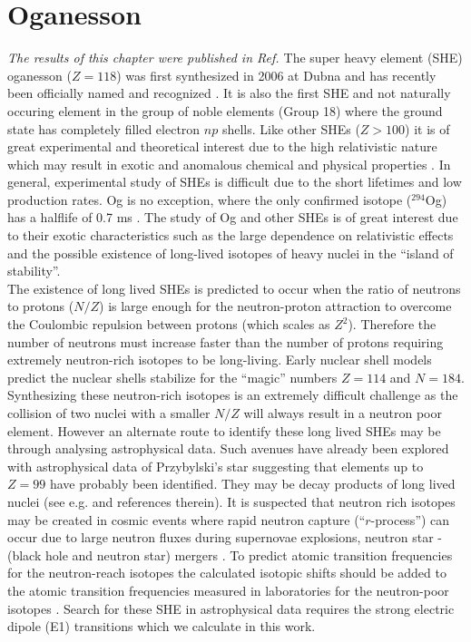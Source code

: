 \documentclass[10pt,a4paper, twoside]{report}
\begin{document}
 \chapter{Oganesson} \label{chap:Og}
 \textit{The results of this chapter were published in Ref. \cite{LDFOg2018}}
The super heavy element (SHE) oganesson ($Z=118$) was first synthesized in 2006 at Dubna \cite{OganessianOg2006} and has recently been officially named and recognized \cite{Karol2016}.  It is also the first SHE and not naturally occuring element in the group of noble elements (Group 18) where the ground state has completely filled electron $np$ shells. Like other SHEs  ($Z>100$) it is of great experimental and theoretical interest due to the high relativistic nature  which may result in exotic and anomalous chemical and physical properties \cite{Pershina2009, Schwerdtfeger2014}. In general, experimental study of SHEs is difficult  due to the short lifetimes and low production rates. Og is no exception, where the only confirmed isotope ($^{294}$Og) has a halflife of 0.7 ms \cite{OganessianOg2006}. The study of Og and other SHEs is of great interest due to their exotic characteristics such as the large dependence on relativistic effects and the possible existence of long-lived isotopes of heavy nuclei in the ``island of stability''. \\
\linebreak
The existence of long lived SHEs is predicted to occur when the ratio of neutrons to protons ($N/Z$) is large enough for the neutron-proton attraction to overcome  the Coulombic repulsion between protons (which scales as $Z^2$). Therefore the number of neutrons must increase faster than the number of protons requiring extremely neutron-rich isotopes to be  long-living\cite{OUL2004, HHO2013}.  Early nuclear shell models predict the nuclear shells stabilize for the ``magic'' numbers $Z=114$ and $N=184$\cite{OUL2004, HHO2013}. Synthesizing these neutron-rich isotopes is an extremely difficult challenge as the collision of two nuclei with a smaller $N/Z$ will always result in a neutron poor element.  However an alternate route to identify these long lived SHEs may be through analysing astrophysical data. Such avenues have already been explored with astrophysical data of  Przybylski's star suggesting that elements up to $Z=99$ have probably  been identified\cite{Polukhina2012, Gopka2008, Fivet2007}.  They may be decay products of long lived nuclei (see e.g.   \cite{DFW17} and references therein).  It is suspected that neutron rich isotopes may be created in cosmic events where rapid neutron capture (``$r$-process'') can occur due to large neutron fluxes during supernovae explosions, neutron star - (black hole and neutron star) mergers \cite{Goriely2011, Fuller2017, Friebel2018, Schuetrumpf2015}. To predict  atomic transition frequencies  for the neutron-reach isotopes the  calculated isotopic shifts should be added to the atomic transition frequencies measured in laboratories for the neutron-poor isotopes \cite{DFW17}. Search for these SHE in astrophysical data requires the strong electric dipole (E1) transitions which we calculate in this work.
\end{document}
